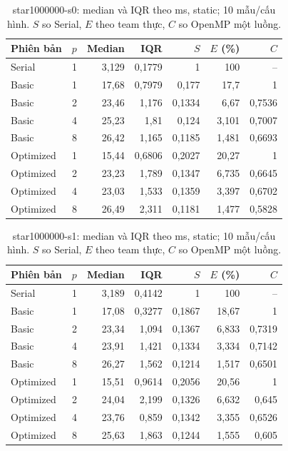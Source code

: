 \begin{table}[htbp]
\centering\small
\caption[star1000000-s0: thống kê static]{star1000000-s0: median và IQR theo ms, static; 10 mẫu/cấu hình. $S$ so Serial, $E$ theo team thực, $C$ so OpenMP một luồng.}
\label{tab:star1000000-s0}
\begin{tabular}{lrrrrrr}
\toprule
Phiên bản & $p$ & Median & IQR & $S$ & $E$ (\%) & $C$ \\
\midrule
Serial & 1 & 3,129 & 0,1779 & 1 & 100 & -- \\
Basic & 1 & 17,68 & 0,7979 & 0,177 & 17,7 & 1 \\
Basic & 2 & 23,46 & 1,176 & 0,1334 & 6,67 & 0,7536 \\
Basic & 4 & 25,23 & 1,81 & 0,124 & 3,101 & 0,7007 \\
Basic & 8 & 26,42 & 1,165 & 0,1185 & 1,481 & 0,6693 \\
Optimized & 1 & 15,44 & 0,6806 & 0,2027 & 20,27 & 1 \\
Optimized & 2 & 23,23 & 1,789 & 0,1347 & 6,735 & 0,6645 \\
Optimized & 4 & 23,03 & 1,533 & 0,1359 & 3,397 & 0,6702 \\
Optimized & 8 & 26,49 & 2,311 & 0,1181 & 1,477 & 0,5828 \\
\bottomrule
\end{tabular}
\end{table}

\begin{table}[htbp]
\centering\small
\caption[star1000000-s1: thống kê static]{star1000000-s1: median và IQR theo ms, static; 10 mẫu/cấu hình. $S$ so Serial, $E$ theo team thực, $C$ so OpenMP một luồng.}
\label{tab:star1000000-s1}
\begin{tabular}{lrrrrrr}
\toprule
Phiên bản & $p$ & Median & IQR & $S$ & $E$ (\%) & $C$ \\
\midrule
Serial & 1 & 3,189 & 0,4142 & 1 & 100 & -- \\
Basic & 1 & 17,08 & 0,3277 & 0,1867 & 18,67 & 1 \\
Basic & 2 & 23,34 & 1,094 & 0,1367 & 6,833 & 0,7319 \\
Basic & 4 & 23,91 & 1,421 & 0,1334 & 3,334 & 0,7142 \\
Basic & 8 & 26,27 & 1,562 & 0,1214 & 1,517 & 0,6501 \\
Optimized & 1 & 15,51 & 0,9614 & 0,2056 & 20,56 & 1 \\
Optimized & 2 & 24,04 & 2,199 & 0,1326 & 6,632 & 0,645 \\
Optimized & 4 & 23,76 & 0,859 & 0,1342 & 3,355 & 0,6526 \\
Optimized & 8 & 25,63 & 1,863 & 0,1244 & 1,555 & 0,605 \\
\bottomrule
\end{tabular}
\end{table}

